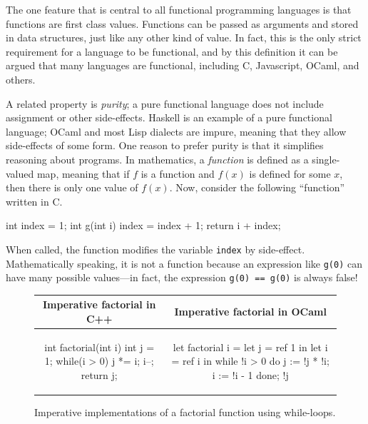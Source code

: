 
The one feature that is central to all functional programming languages is that functions are first
class values.  Functions can be passed as arguments and stored in data structures, just
like any other kind of value.  In fact, this is the only strict requirement for a language to be
functional, and by this definition it can be argued that many languages are functional, including C,
Javascript, OCaml, and others.

A related property is \emph{purity}; a pure functional language does not include assignment or other
side-effects.  Haskell is an example of a pure functional language; OCaml and most Lisp dialects are
impure, meaning that they allow side-effects of some form.  One reason to prefer purity is that it
simplifies reasoning about programs.  In mathematics, a \emph{function} is defined as a
single-valued map, meaning that if $f$ is a function and $f(x)$ is defined for some $x$, then there
is only one value of $f(x)$.  Now, consider the following ``function'' written in C.

\begin{ccode}
int index = 1;
int g(int i) {
   index = index + 1;
   return i + index;
}
\end{ccode}
%
When called, the function modifies the variable \hbox{\lstinline/index/} by side-effect.  Mathematically
speaking, it is not a function because an expression like \hbox{\lstinline/g(0)/} can have many
possible values---in fact, the expression \hbox{\lstinline/g(0) == g(0)/} is always false!

\begin{figure}[t]
\begin{center}
\begin{tabular}{c|c}
Imperative factorial in C++ & Imperative factorial in OCaml\\
\hline\hline
\begin{clisting}
int factorial(int i) {
    int j = 1;
    while(i > 0) {
        j *= i;
        i--;
    }
    return j;
}
\end{clisting}
&
\begin{ocamllisting}
let factorial i =
    let j = ref 1 in
    let i = ref i in
    while !i > 0 do
       j := !j * !i;
       i := !i - 1
    done;
    !j
\end{ocamllisting}
\end{tabular}
\end{center}
\caption{Imperative implementations of a factorial function using while-loops.}
\label{figure:imp-fact2}
\end{figure}

